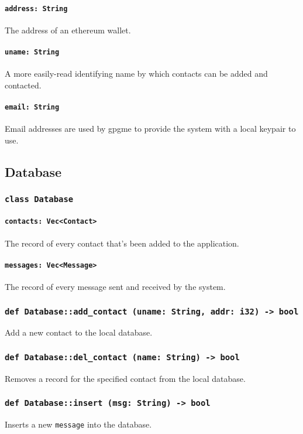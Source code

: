 \documentclass[]{article}
\begin{document}
\paragraph{\texttt{address: String}}
The address of an ethereum wallet.
\paragraph{\texttt{uname: String}}
A more easily-read identifying name by which contacts can be added and contacted.
\paragraph{\texttt{email: String}}
Email addresses are used by gpgme to provide the system with a local keypair to use.

\subsection{Database}
\subsubsection{\texttt{class Database}}
\paragraph{\texttt{contacts: Vec<Contact>}} The record of every contact that's been added to the application. 
\paragraph{\texttt{messages: Vec<Message>}} The record of every message sent and received by the system.
\subsubsection{\texttt{def Database::add\_contact (uname: String, addr: i32) -> bool}}
Add a new contact to the local database.
\subsubsection{\texttt{def Database::del\_contact (name: String) -> bool}}
Removes a record for the specified contact from the local database.
\subsubsection{\texttt{def Database::insert (msg: String) -> bool}}
Inserts a new \verb!message! into the database.
\end{document}
